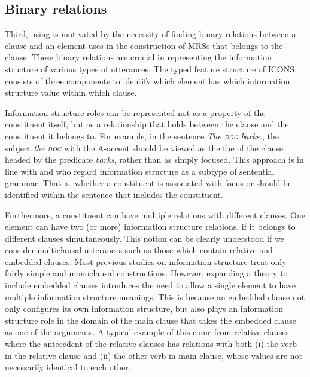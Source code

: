 \subsection{Binary relations}
\label{9:ssec:binary}


Third, using  is motivated by the necessity of finding
binary relations between a clause and an element uses in the
construction of MRSs that belongs to the clause. These binary
relations are crucial in representing the information structure of
various types of utterances.  The typed feature structure of ICONS
consists of three components to identify which element has which
information structure value within which clause.


Information structure roles can be represented not as a property of
the constituent itself, but as a relationship that holds between the
clause and the constituent it belongs to. For example, in the 
sentence \textit{The \textsc{dog} barks.}, the subject \textit{the
  \textsc{dog}} with the A-accent should be viewed as the the  of
the clause headed by the predicate \textit{barks}, rather than as
simply focused.  This approach is in line with \citet{lambrecht:96}
and \citet{engdahl:vallduvi:96} who regard information structure as a
subtype of sentential grammar. That is, whether a
constituent is associated with focus or  should be identified
within the sentence that includes the constituent.


Furthermore, a constituent can have multiple relations with different
clauses. One element can have two (or more) information structure
relations, if it belongs to different clauses simultaneously.  This
notion can be clearly understood if we consider multiclausal
utterances such as those which contain relative and embedded clauses.
Most previous studies on information structure treat only fairly
simple and monoclausal constructions. However, expanding a theory to
include embedded clauses introduces the need to allow a single element
to have multiple information structure meanings.  This is because an
embedded clause not only configures its own information structure, but
also plays an information structure role in the domain of the main
clause that takes the embedded clause as one of the
arguments. A typical example of this come from
relative clauses where the antecedent of the relative clauses has
relations with both (i) the verb in the relative clause and (ii) the
other verb in main clause, whose values are not necessarily identical
to each other.




